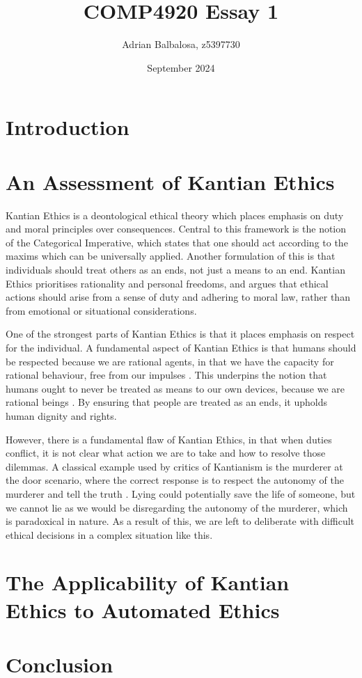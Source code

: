\documentclass{article}
\title{COMP4920 Essay 1}
\author{Adrian Balbalosa, z5397730}
\date{September 2024}
\begin{document}
\maketitle

\section{Introduction}

\section{An Assessment of Kantian Ethics}
Kantian Ethics is a deontological ethical theory which places emphasis on duty and
moral principles over consequences. Central to this framework is the notion of the
Categorical Imperative, which states that one should act according to the maxims which
can be universally applied. Another formulation of this is that individuals should treat
others as an ends, not just a means to an end. Kantian Ethics prioritises rationality and
personal freedoms, and argues that ethical actions should arise from a sense of duty and
adhering to moral law, rather than from emotional or situational considerations.

One of the strongest parts of Kantian Ethics is that it places emphasis on respect
for the individual. A fundamental aspect of Kantian Ethics is that 
humans should be respected because we are rational agents,
in that we have the capacity for rational behaviour, free from our impulses \parencite[p. 77]{bennet2015}.
This underpins the notion that humans ought to never be treated as means to our own devices,
because we are rational beings \parencite[p. 77]{bennet2015}. By ensuring that people are treated as
an ends, it upholds human dignity and rights.

However, there is a fundamental flaw of Kantian Ethics, in that when duties conflict, it is
not clear what action we are to take and how to resolve those dilemmas. A classical example used by
critics of Kantianism is the murderer at the door scenario, where the correct response is to respect
the autonomy of the murderer and tell the truth \parencite[p. 81]{bennet2015}. Lying could potentially 
save the life of someone, but we cannot lie as we would be disregarding the autonomy of the murderer, which
is paradoxical in nature. As a result of this, we are left to deliberate with difficult ethical decisions in
a complex situation like this.
\section{The Applicability of Kantian Ethics to Automated Ethics}
\section{Conclusion}
\printbibliography[title={References}]
\end{document}

